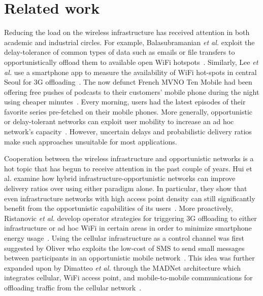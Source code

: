\documentclass[preprint]{elsarticle}
\begin{document}
\section{Related work}
\label{sec:related}

Reducing the load on the wireless infrastructure has received attention in both academic and industrial circles. For example, Balasubramanian \textit{et al.} exploit the delay-tolerance of common types of data such as emails or file transfers to opportunistically offload them to available open WiFi hotspots~\cite{balasubramaniam:augmenting}. Similarly, Lee \textit{et al.} use a smartphone app to measure the availability of WiFi hot-spots in central Seoul for 3G offloading~\cite{Lee2010}. The now defunct French MVNO Ten Mobile had been offering free pushes of podcasts to their customers' mobile phone during the night using cheaper minutes~\cite{ten_mobile}. Every morning, users had the latest episodes of their favorite series pre-fetched on their mobile phones. More generally, opportunistic or delay-tolerant networks can exploit user mobility to increase an ad hoc network's capacity~\cite{GrossglauserTse02}. However, uncertain delays and probabilistic delivery ratios make such approaches unsuitable for most applications.

Cooperation between the wireless infrastructure and opportunistic networks is a hot topic that has begun to receive attention in the past couple of years. Hui et al. examine how hybrid infrastructure-opportunistic networks can improve delivery ratios over using either paradigm alone. In particular, they show that even infrastructure networks with high access point density can still significantly benefit from the opportunistic capabilities of its users~\cite{hui2009empirical}. More proactively, Ristanovic \textit{et al.} develop operator strategies for triggering 3G offloading to either infrastructure or ad hoc WiFi in certain areas in order to minimize smartphone energy usage~\cite{Ristanovic2011}. Using the cellular infrastructure as a control channel was first suggested by Oliver who exploits the low-cost of SMS to send small messages between participants in an opportunistic mobile network~\cite{oliver2008exploiting}. This idea was further expanded upon by Dimatteo \textit{et al.} through the MADNet architecture which integrates cellular, WiFi access point, and mobile-to-mobile communications for offloading traffic from the cellular network~\cite{Dimatteo2011}.
\end{document}
